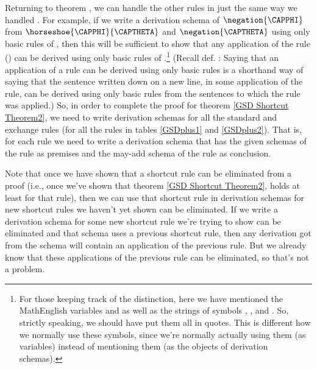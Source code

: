 Returning to theorem , we can handle the other rules in just the same way we handled . 
For example, if we write a derivation schema of $\negation{\CAPPHI}$ from $\horseshoe{\CAPPHI}{\CAPTHETA}$ and $\negation{\CAPTHETA}$ using only basic rules of \GSD{}, then this will be sufficient to show that any application of the rule  () can be derived using only basic rules of \GSD{}.\footnote{For
those keeping track of the  distinction, here we have mentioned the MathEnglish variables \mention{$\CAPPHI$} and \mention{$\CAPTHETA$} as well as the strings of symbols \mention{$\negation{\CAPPHI}$}, \mention{$\horseshoe{\CAPPHI}{\CAPTHETA}$}, and \mention{$\negation{\CAPTHETA}$}. 
So, strictly speaking, we should have put them all in quotes.
This is different how we normally use these symbols, since we're normally actually using them (as variables) instead of mentioning them (as the objects of derivation schemas).}
(Recall def. : Saying that an application of a rule can be derived using only basic rules is a shorthand way of saying that the sentence written down on a new line, in some application of the rule, can be derived using only basic rules from the sentences to which the rule was applied.)
So, in order to complete the proof for theorem \ref{GSD Shortcut Theorem2}, we need to write derivation schemas for all the standard and exchange rules (for all the rules in tables \ref{GSDplus1} and \ref{GSDplus2}).
That is, for each rule we need to write a derivation schema that has the given schemas of the rule as premises and the may-add schema of the rule as conclusion. 

Note that once we have shown that a shortcut rule can be eliminated from a proof (i.e., once we've shown that theorem \ref{GSD Shortcut Theorem2}, holds at least for that rule), then we can use that shortcut rule in derivation schemas for new shortcut rules we haven't yet shown can be eliminated. 
If we write a derivation schema for some new shortcut rule we're trying to show can be eliminated and that schema uses a previous shortcut rule, then any derivation got from the schema will contain an application of the previous rule.
But we already know that these applications of the previous rule can be eliminated, so that's not a problem.  

